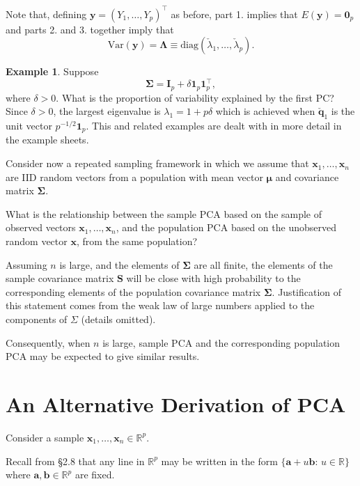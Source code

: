 \documentclass[]{book}
\theoremstyle{definition}
\theoremstyle{definition}
\newtheorem{example}{Example}[chapter]
\theoremstyle{definition}
\theoremstyle{remark}
\begin{document}
Note that, defining \(\boldsymbol y=(Y_1, \ldots , Y_p)^\top\) as before, part 1. implies that \(E(\boldsymbol y)={\mathbf 0}_p\) and parts 2. and 3. together imply that
\[
\text{Var}(\boldsymbol y)=\boldsymbol \Lambda\equiv \text{diag}(\check{\lambda}_1, \ldots , \check{\lambda}_p).
\]

\begin{example}
\protect\hypertarget{exm:unnamed-chunk-10}{}{\label{exm:unnamed-chunk-10} }Suppose
\[
\boldsymbol \Sigma=\boldsymbol I_p+ \delta {\mathbf 1}_p {\mathbf 1}_p^\top,
\]
where \(\delta>0\). What is the proportion of variability explained by the first PC? Since \(\delta>0\), the largest eigenvalue is \(\lambda_1=1+p\delta\) which is achieved when \(\check{\boldsymbol q}_1\) is the unit vector \(p^{-1/2}{\mathbf 1 }_p\). This and related examples are dealt with in more detail in the example sheets.
\end{example}

Consider now a repeated sampling framework in which we assume that \(\boldsymbol x_1, \ldots , \boldsymbol x_n\) are IID random vectors from a population
with mean vector \(\pmb \mu\) and covariance matrix \(\boldsymbol \Sigma\).

What is the relationship between the sample PCA based on the sample of observed vectors \(\boldsymbol x_1, \ldots , \boldsymbol x_n\), and the population PCA based on the unobserved random vector \(\boldsymbol x\),
from the same population?

Assuming \(n\) is large, and the elements of \(\boldsymbol \Sigma\) are all finite, the elements of the sample covariance matrix \(\boldsymbol S\) will be close with high probability to the corresponding elements
of the population covariance matrix \(\boldsymbol \Sigma\). Justification of this statement comes from the weak law of large numbers applied to the components of \(\Sigma\) (details omitted).

Consequently, when \(n\) is large, sample PCA and the corresponding population PCA may be expected to give similar results.

\hypertarget{an-alternative-derivation-of-pca}{%
\section{An Alternative Derivation of PCA}\label{an-alternative-derivation-of-pca}}

Consider a sample \(\boldsymbol x_1, \ldots , \boldsymbol x_n \in \mathbb{R}^p\).

Recall from \S2.8 that any line in \(\mathbb{R}^p\) may be written in the form
\(\{\boldsymbol a+u \boldsymbol b: \, u \in \mathbb{R}\}\) where \(\boldsymbol a, \boldsymbol b\in \mathbb{R}^p\) are
fixed.
\end{document}
